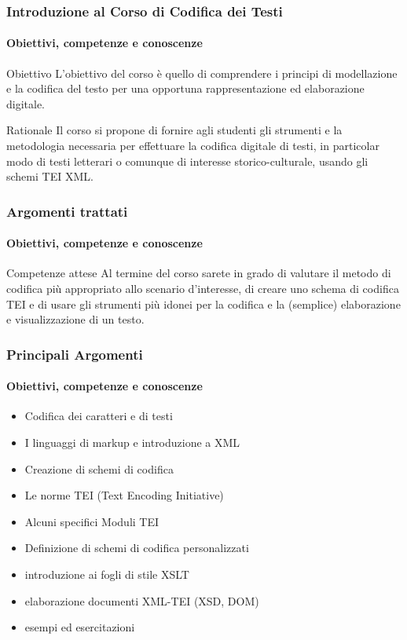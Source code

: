 \begin{frame}
    \frametitle{Introduzione al Corso di Codifica dei Testi}
    \framesubtitle{Obiettivi, competenze e conoscenze}
    \addtocounter{nframe}{1}
    
    \begin{block}{Obiettivo}
        L'obiettivo del corso è quello di comprendere i principi di modellazione e la codifica del testo per una opportuna rappresentazione ed elaborazione digitale.  
    \end{block}

    \begin{block}{Rationale}
       Il corso si propone di fornire agli studenti gli strumenti e la metodologia necessaria per effettuare la codifica digitale di testi, in particolar modo di testi letterari o comunque di interesse storico-culturale, usando gli schemi TEI XML.
    \end{block}

\end{frame}

\begin{frame}
    \frametitle{Argomenti trattati}
    \framesubtitle{Obiettivi, competenze e conoscenze}
    \addtocounter{nframe}{1}
    
    \begin{block}{Competenze attese}
        Al termine del corso sarete in grado di valutare il metodo di codifica più appropriato allo scenario d'interesse, di creare uno schema di codifica TEI e di usare gli strumenti più idonei per la codifica e la (semplice) elaborazione e visualizzazione di un testo.
    \end{block}

    

\end{frame}

\begin{frame}
    \frametitle{Principali Argomenti}
    \framesubtitle{Obiettivi, competenze e conoscenze}
    \addtocounter{nframe}{1}

    
        \begin{itemize}
            \item Codifica dei caratteri e di testi
            \item I linguaggi di markup e introduzione a XML
            \item Creazione di schemi di codifica
            \item Le norme TEI (Text Encoding Initiative)
            \item Alcuni specifici Moduli TEI
            \item Definizione di schemi di codifica personalizzati
            \item introduzione ai fogli di stile XSLT
            \item elaborazione documenti XML-TEI (XSD, DOM)
            \item esempi ed esercitazioni 
        \end{itemize}
    

\end{frame}